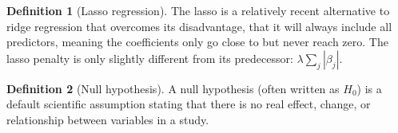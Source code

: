 \documentclass{article}
\theoremstyle{definition}
\newtheorem{definition}{Definition}
\theoremstyle{Solution}
\begin{document}
\begin{definition}[Lasso regression]
The lasso is a relatively recent alternative to ridge regression that overcomes its disadvantage, that it will always include all predictors, meaning the coefficients only go close to but never reach zero. The lasso penalty is only slightly different from its predecessor: $\lambda\sum_{j}^{}|\beta_j|$.
\end{definition}

\begin{definition}[Null hypothesis]
A null hypothesis (often written as $H_0$) is a default scientific assumption stating that there is no real effect, change, or relationship between variables in a study.
\end{definition}
\end{document}
